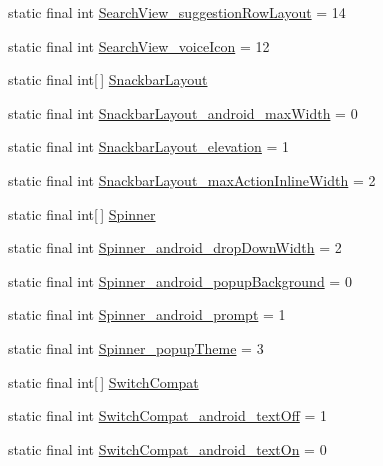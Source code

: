 \begin{DoxyCompactItemize}
static final int \hyperlink{classcheck_1_1test_1_1_r_1_1styleable_a017153f998c419cbe736bd819098f898}{Search\+View\+\_\+suggestion\+Row\+Layout} = 14
\item 
static final int \hyperlink{classcheck_1_1test_1_1_r_1_1styleable_acb56cf2aa22fa1d1f6c6bfeed93c46e3}{Search\+View\+\_\+voice\+Icon} = 12
\item 
static final int\mbox{[}$\,$\mbox{]} \hyperlink{classcheck_1_1test_1_1_r_1_1styleable_ad7fc8f60242ddfaa068c43f614e1ff65}{Snackbar\+Layout}
\item 
static final int \hyperlink{classcheck_1_1test_1_1_r_1_1styleable_a57a3c123cbfb81d22fa7a394c46add63}{Snackbar\+Layout\+\_\+android\+\_\+max\+Width} = 0
\item 
static final int \hyperlink{classcheck_1_1test_1_1_r_1_1styleable_a803835166d359a018ca194cce78d142c}{Snackbar\+Layout\+\_\+elevation} = 1
\item 
static final int \hyperlink{classcheck_1_1test_1_1_r_1_1styleable_aa211406667d57a64a280c2c24e4a106d}{Snackbar\+Layout\+\_\+max\+Action\+Inline\+Width} = 2
\item 
static final int\mbox{[}$\,$\mbox{]} \hyperlink{classcheck_1_1test_1_1_r_1_1styleable_ae9bbc621da309e840c0cacd528d5d439}{Spinner}
\item 
static final int \hyperlink{classcheck_1_1test_1_1_r_1_1styleable_a0f8793af1c217d7771c8d1860fa6a1e8}{Spinner\+\_\+android\+\_\+drop\+Down\+Width} = 2
\item 
static final int \hyperlink{classcheck_1_1test_1_1_r_1_1styleable_af3a17f8a0e3b61c605894eed3a35f9a4}{Spinner\+\_\+android\+\_\+popup\+Background} = 0
\item 
static final int \hyperlink{classcheck_1_1test_1_1_r_1_1styleable_af103d6b67bae0598aa2d77310b3aab0d}{Spinner\+\_\+android\+\_\+prompt} = 1
\item 
static final int \hyperlink{classcheck_1_1test_1_1_r_1_1styleable_a119cd6dc9855dc91a0bd24dd52b9ee01}{Spinner\+\_\+popup\+Theme} = 3
\item 
static final int\mbox{[}$\,$\mbox{]} \hyperlink{classcheck_1_1test_1_1_r_1_1styleable_a0c8f3659ebec12826f8a2493fe43eaf4}{Switch\+Compat}
\item 
static final int \hyperlink{classcheck_1_1test_1_1_r_1_1styleable_ab84183d5d84d551d811f6b8114e6cf0c}{Switch\+Compat\+\_\+android\+\_\+text\+Off} = 1
\item 
static final int \hyperlink{classcheck_1_1test_1_1_r_1_1styleable_a23563184e5ab5fb5a8d99269e8aba6cb}{Switch\+Compat\+\_\+android\+\_\+text\+On} = 0

\end{DoxyCompactItemize}
